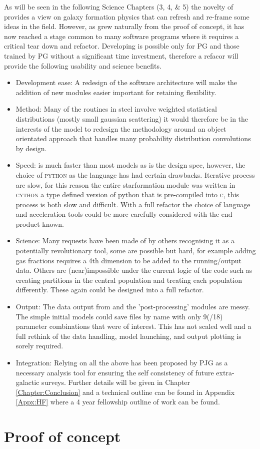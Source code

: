 As will be seen in the following Science Chapters (3, 4, & 5) the novelty of \steel provides a view on galaxy formation physics that can refresh and re-frame some ideas in the field. However, as \steel grew naturally from the proof of concept, it has now reached a stage common to many software programs where it requires a critical tear down and refactor. Developing \steel is possible only for PG and those trained by PG without a significant time investment, therefore a refacor will provide the following usability and science benefits. 
\begin{itemize}
    \item Development ease: A redesign of the software architecture will make the addition of new modules easier important for retaining flexibility.
    \item Method: Many of the routines in steel involve weighted statistical distributions (mostly small gaussian scattering) it would therefore be in the interests of the model to redesign the methodology around an object orientated approach that handles many probability distribution convolutions by design.
    \item Speed: \steel is much faster than most models as is the design spec, however, the choice of \textsc{python} as the language has had certain drawbacks.  Iterative process are slow, for this reason the entire starformation module was written in \textsc{cython} a type defined version of python that is pre-compiled into \textsc{c}, this process is both slow and difficult. With a full refactor the choice of language and acceleration tools could be more carefully considered with the end product known.
    \item Science: Many requests have been made of \steel by others recognising it as a potentially revolutionary tool, some are possible but hard, for example adding gas fractions requires a 4th dimension to be added to the running/output data. Others are (near)impossible under the current logic of the code such as creating partitions in the central population and treating each population differently. These again could be designed into a full refactor.
    \item Output: The data output from \steel and the 'post-processing' modules are messy. The simple initial models could save files by name with only 9(/18) parameter combinations that were of interest. This has not scaled well and a full rethink of the data handling, model launching, and output plotting is sorely required.
    \item Integration: Relying on all the above \steel has been proposed by PJG as a necessary analysis tool for ensuring the self consistency of future extra-galactic surveys. Further details will be given in Chapter \ref{Chapter:Conclusion} and a technical outline can be found in Appendix \ref{Appx:HF} where a 4 year fellowship outline of work can be found.
\end{itemize}

\pagebreak
\section{Proof of concept}
\label{sec:Proof}
\inputminted{python}{Codes/Proof.py}
